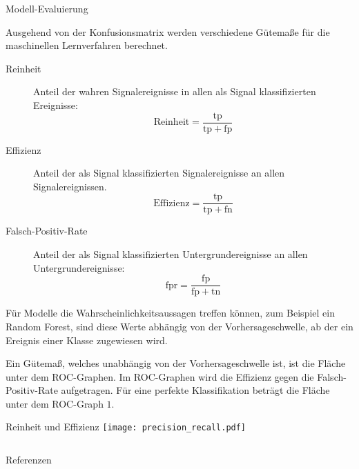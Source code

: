 \documentclass[t]{beamer}
\begin{document}
\begin{columns}[onlytextwidth]
\begin{column}{0.5\textwidth}
\begin{block}{Modell-Evaluierung}
\begin{multicols}{2}
          Ausgehend von der Konfusionsmatrix werden verschiedene Gütemaße für die maschinellen
          Lernverfahren berechnet.
          \begin{description}
            \item[Reinheit] Anteil der wahren Signalereignisse in allen als Signal klassifizierten
              Ereignisse:
              \begin{equation}
                \mathrm{Reinheit} = \frac{\mathrm{tp}}{\mathrm{tp} + \mathrm{fp}}
              \end{equation}
            \item[Effizienz] Anteil der als Signal klassifizierten Signalereignisse an
              allen Signalereignissen.
              \begin{equation}
                \mathrm{Effizienz} = \frac{\mathrm{tp}}{\mathrm{tp} + \mathrm{fn}}
              \end{equation}
            \item[Falsch-Positiv-Rate] Anteil der als Signal klassifizierten Untergrundereignisse
              an allen Untergrundereignisse:
              \begin{equation}
                \mathrm{fpr} = \frac{\mathrm{fp}}{\mathrm{fp} + \mathrm{tn}}
              \end{equation}
          \end{description}

          Für Modelle die Wahrscheinlichkeitsaussagen treffen können, zum Beispiel 
          ein Random Forest, sind diese Werte abhängig von der Vorhersageschwelle, ab
          der ein Ereignis einer Klasse zugewiesen wird.

          Ein Gütemaß, welches unabhängig von der Vorhersageschwelle ist, ist die Fläche
          unter dem ROC-Graphen. Im ROC-Graphen wird die Effizienz gegen die Falsch-Positiv-Rate
          aufgetragen.
          Für eine perfekte Klassifikation beträgt die Fläche unter dem ROC-Graph $1$.
        \end{multicols}
      \end{block}
      \begin{block}{Reinheit und Effizienz}
        \texttt{[image: precision\_recall.pdf]}
      \end{block}
    \end{column}%
  \end{columns}%

  \vspace*{\fill}
  \begin{block}[equal height group=bottom, fonttitle=\normalsize]{Referenzen}
    \begin{multicols}{3}
      \nocite{*}\footnotesize%
      \printbibliography%
    \end{multicols}
  \end{block}
\end{document}
